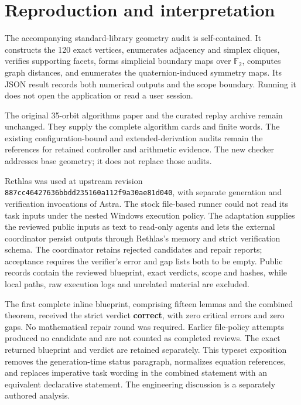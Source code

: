 \documentclass[
  10pt,
  a4paper,
]{article}
\begin{document}
\section{Reproduction and
interpretation}\label{reproduction-and-interpretation}

The accompanying standard-library geometry audit is self-contained. It
constructs the 120 exact vertices, enumerates adjacency and simplex
cliques, verifies supporting facets, forms simplicial boundary maps over
\(\mathbb F_2\), computes graph distances, and enumerates the
quaternion-induced symmetry maps. Its JSON result records both numerical
outputs and the scope boundary. Running it does not open the application
or read a user session.

The original 35-orbit algorithms paper and the curated replay archive
remain unchanged. They supply the complete algorithm cards and finite
words. The existing configuration-bound and extended-derivation audits
remain the references for retained controller and arithmetic evidence.
The new checker addresses base geometry; it does not replace those
audits.

Rethlas was used at upstream revision
\texttt{887cc46427636bbdd235160a112f9a30ae81d040}, with separate
generation and verification invocations of Astra. The stock file-based
runner could not read its task inputs under the nested Windows execution
policy. The adaptation supplies the reviewed public inputs as text to
read-only agents and lets the external coordinator persist outputs
through Rethlas's memory and strict verification schema. The coordinator
retains rejected candidates and repair reports; acceptance requires the
verifier's error and gap lists both to be empty. Public records contain
the reviewed blueprint, exact verdicts, scope and hashes, while local
paths, raw execution logs and unrelated material are excluded.

The first complete inline blueprint, comprising fifteen lemmas and the
combined theorem, received the strict verdict \textbf{correct}, with
zero critical errors and zero gaps. No mathematical repair round was
required. Earlier file-policy attempts produced no candidate and are not
counted as completed reviews. The exact returned blueprint and verdict
are retained separately. This typeset exposition removes the
generation-time status paragraph, normalizes equation references, and
replaces imperative task wording in the combined statement with an
equivalent declarative statement. The engineering discussion is a
separately authored analysis.
\end{document}
